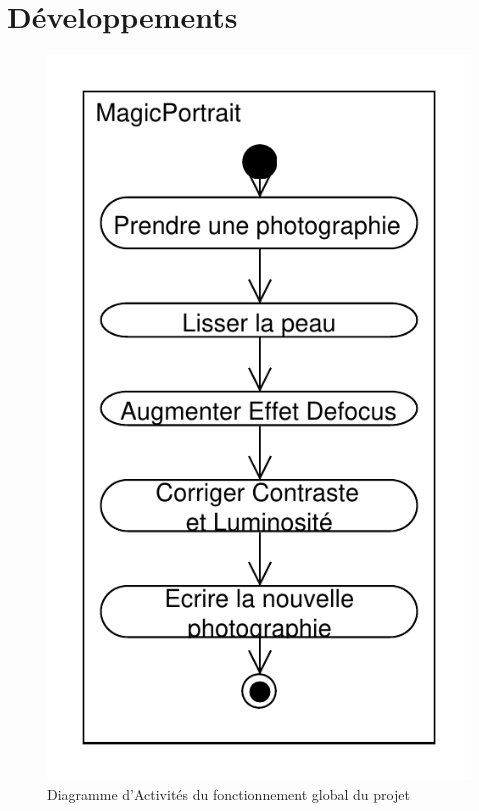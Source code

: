 \documentclass[11pt, french]{report-rd-info}
\begin{document}
\section{Développements}

\begin{figure}
\centering
\includegraphics[scale=0.5]{Diagrammes/DiagrammeActivites_00_Global}
\caption{Diagramme d'Activités du fonctionnement global du projet}
\label{diag:diagramme00}
\end{figure}
\end{document}
